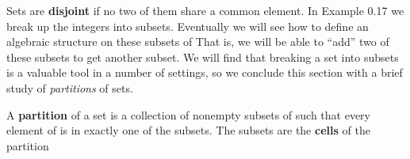 \documentclass[11pt,oneside]{article}
\begin{document}
\begin{BookBody}

\noindent Sets are\textbf{ disjoint} if no two of them share a common element. In Example 0.17 we break up the integers into subsets. Eventually we will see how to define an algebraic structure on these subsets of  That is, we will be able to “add” two of these subsets to get another subset. We will find that breaking a set into subsets is a valuable tool in a number of settings, so we conclude this section with a brief study of\textit{ partitions} of sets.

 A\textbf{ partition} of a set  is a collection of nonempty subsets of  such that every element of  is in exactly one of the subsets. The subsets are the\textbf{ cells} of the partition\BookEnd{\blacksquare}

\end{BookBody}

\BookNarrativetrue
\end{document}
